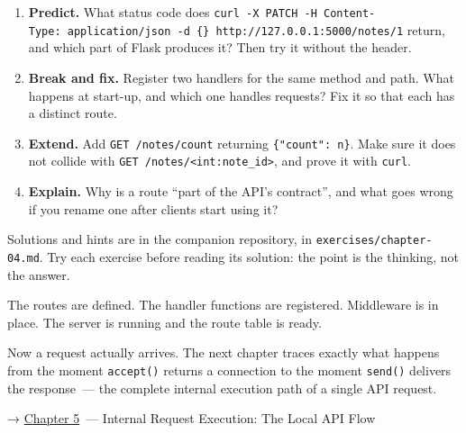 \label{04-request-handling-paths:exercises}

\begin{enumerate}
\def\labelenumi{\arabic{enumi}.}
\tightlist
\item
  \textbf{Predict.} What status code does \texttt{curl\ -}\allowbreak{}\texttt{X\ PATCH\ -}\allowbreak{}\texttt{H\ \textquotesingle{}Content-}\allowbreak{}\texttt{Type:}\allowbreak{}\texttt{\ application/}\allowbreak{}\texttt{json\textquotesingle{}\ -}\allowbreak{}\texttt{d\ \textquotesingle{}\{\}\textquotesingle{}\ http:}\allowbreak{}\texttt{/}\allowbreak{}\texttt{/}\allowbreak{}\texttt{127.}\allowbreak{}\texttt{0.}\allowbreak{}\texttt{0.}\allowbreak{}\texttt{1:}\allowbreak{}\texttt{5000/}\allowbreak{}\texttt{notes/}\allowbreak{}\texttt{1} return, and which part of Flask produces it? Then try it without the header.
\item
  \textbf{Break and fix.} Register two handlers for the same method and path. What happens at start-up, and which one handles requests? Fix it so that each has a distinct route.
\item
  \textbf{Extend.} Add \texttt{GET\ /notes/count} returning \texttt{\{"count":\ n\}}. Make sure it does not collide with \texttt{GET\ /}\allowbreak{}\texttt{notes/}\allowbreak{}\texttt{\textless{}int:}\allowbreak{}\texttt{note\_}\allowbreak{}\texttt{id\textgreater{}}, and prove it with \texttt{curl}.
\item
  \textbf{Explain.} Why is a route ``part of the API's contract'', and what goes wrong if you rename one after clients start using it?
\end{enumerate}

\noindent{}Solutions and hints are in the companion repository, in \texttt{exercises/}\allowbreak{}\texttt{chapter-04.md}. Try each exercise before reading its solution: the point is the thinking, not the answer.

\label{04-request-handling-paths:whats-next}

The routes are defined. The handler functions are registered. Middleware is in place. The server is running and the route table is ready.

Now a request actually arrives. The next chapter traces exactly what happens from the moment \texttt{accept()} returns a connection to the moment \texttt{send()} delivers the response~--- the complete internal execution path of a single API request.

\noindent{}→ \hyperref[ch:05-internal-request-execution]{Chapter 5}~--- Internal Request Execution: The Local API Flow
